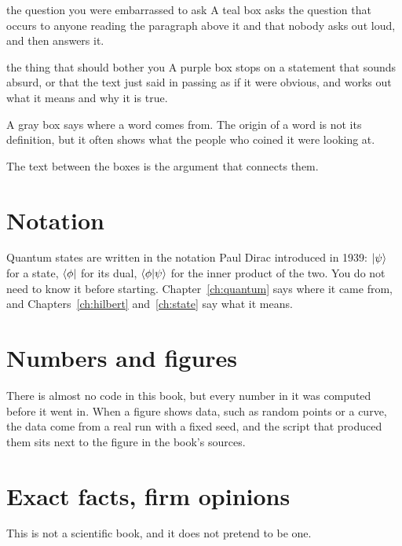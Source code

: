 \begin{question}{the question you were embarrassed to ask}
A teal box asks the question that occurs to anyone reading the paragraph above
it and that nobody asks out loud, and then answers it.
\end{question}

\begin{reflection}{the thing that should bother you}
A purple box stops on a statement that sounds absurd, or that the text just said
in passing as if it were obvious, and works out what it means and why it is
true.
\end{reflection}

\begin{etymology}
A gray box says where a word comes from. The origin of a word is not its
definition, but it often shows what the people who coined it were looking at.
\end{etymology}

The text between the boxes is the argument that connects them.

\section*{Notation}

Quantum states are written in the notation Paul Dirac introduced in 1939: $\ket{\psi}$
for a state, $\bra{\phi}$ for its dual, $\braket{\phi|\psi}$ for the inner product of
the two. You do not need to know it before starting. Chapter~\ref{ch:quantum} says
where it came from, and Chapters~\ref{ch:hilbert} and~\ref{ch:state} say what it
means.

\section*{Numbers and figures}

There is almost no code in this book, but every number in it was computed before it
went in. When a figure shows data, such as random points or a curve, the data come
from a real run with a fixed seed, and the script that produced them sits next to the
figure in the book's sources.

\section*{Exact facts, firm opinions}

This is not a scientific book, and it does not pretend to be one.

